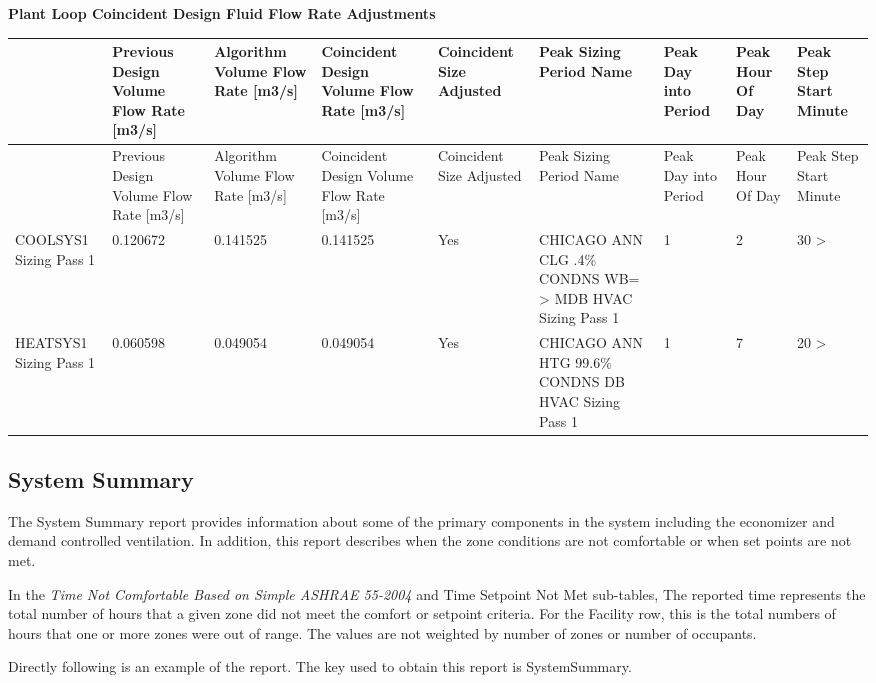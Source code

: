 \textbf{Plant Loop Coincident Design Fluid Flow Rate Adjustments}

{\scriptsize
\begin{longtable}[c]{>{\raggedright}p{0.66in}>{\raggedright}p{0.66in}>{\raggedright}p{0.66in}>{\raggedright}p{0.66in}>{\raggedright}p{0.66in}>{\raggedright}p{0.66in}>{\raggedright}p{0.66in}>{\raggedright}p{0.66in}>{\raggedright}p{0.66in}}
\toprule
 & Previous Design Volume Flow Rate [m3/s] & Algorithm Volume Flow Rate [m3/s] & Coincident Design Volume Flow Rate [m3/s] & Coincident Size Adjusted & Peak Sizing Period Name & Peak Day into Period & Peak Hour Of Day & Peak Step Start Minute \tabularnewline
\midrule
\endfirsthead

\toprule
 & Previous Design Volume Flow Rate [m3/s] & Algorithm Volume Flow Rate [m3/s] & Coincident Design Volume Flow Rate [m3/s] & Coincident Size Adjusted & Peak Sizing Period Name & Peak Day into Period & Peak Hour Of Day & Peak Step Start Minute \tabularnewline
\midrule
\endhead

COOLSYS1 Sizing Pass 1 & 0.120672 & 0.141525 & 0.141525 & Yes & CHICAGO ANN CLG .4\% CONDNS WB= > MDB HVAC Sizing Pass 1 & 1 & 2 & 30 > \tabularnewline
HEATSYS1 Sizing Pass 1 & 0.060598 & 0.049054 & 0.049054 & Yes & CHICAGO ANN HTG 99.6\% CONDNS DB HVAC Sizing Pass 1 & 1 & 7 & 20 > \tabularnewline
\bottomrule
\end{longtable}}

\subsection{System Summary}\label{system-summary}

The System Summary report provides information about some of the primary components in the system including the economizer and demand controlled ventilation. In addition, this report describes when the zone conditions are not comfortable or when set points are not met.

In the \emph{Time Not Comfortable Based on Simple ASHRAE 55-2004} and Time Setpoint Not Met sub-tables, The reported time represents the total number of hours that a given zone did not meet the comfort or setpoint criteria. For the Facility row, this is the total numbers of hours that one or more zones were out of range. The values are not weighted by number of zones or number of occupants.

Directly following is an example of the report. The key used to obtain this report is SystemSummary.

